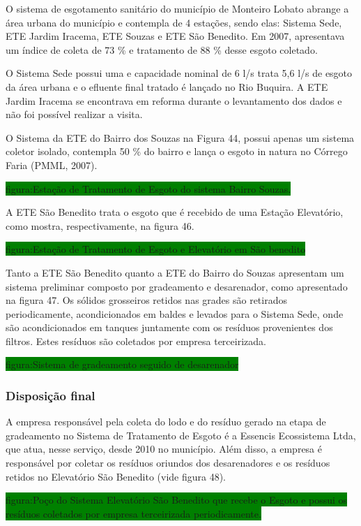 	O sistema de esgotamento sanitário do município de Monteiro Lobato abrange a área urbana do município e contempla de 4 estações, sendo elas: Sistema Sede, ETE Jardim Iracema, ETE Souzas e ETE São Benedito. Em 2007, apresentava um índice de coleta de 73 \% e tratamento de 88 \% desse esgoto coletado. 

	O Sistema Sede possui uma e capacidade nominal de 6 l/s trata 5,6 l/s de esgoto da área urbana e o efluente final tratado é lançado no Rio Buquira. A ETE Jardim Iracema se encontrava em reforma durante o levantamento dos dados e não foi possível realizar a visita. 
	
	O Sistema da ETE do Bairro dos Souzas na Figura 44, possui apenas um sistema coletor isolado, contempla 50 \% do bairro e lança o esgoto in natura no Córrego Faria (PMML, 2007). 
	
	\colorbox{green}{figura:Estação de Tratamento de Esgoto do sistema Bairro Souzas.}
	
	A ETE São Benedito trata o esgoto que é recebido de uma Estação Elevatório, como mostra, respectivamente, na figura 46. 
	
	\colorbox{green}{figura:Estação de Tratamento de Esgoto e Elevatório em São benedito}
	
	Tanto a ETE São Benedito quanto a ETE do Bairro do Souzas apresentam um sistema preliminar composto por gradeamento e desarenador, como apresentado na figura 47. Os sólidos grosseiros retidos nas grades são retirados periodicamente, acondicionados em baldes e levados para o Sistema Sede, onde são acondicionados em tanques juntamente com os resíduos provenientes dos filtros. Estes resíduos são coletados por empresa terceirizada.
	
	\colorbox{green}{figura:Sistema de gradeamento seguido de desarenador}
	
	\subsubsection{Disposição final}
	
	A empresa responsável pela coleta do lodo e do resíduo gerado na etapa de gradeamento no Sistema de Tratamento de Esgoto é a Essencis Ecossistema Ltda, que atua, nesse serviço, desde 2010 no município. Além disso, a empresa é responsável por coletar os resíduos oriundos dos desarenadores e os resíduos retidos no Elevatório São Benedito (vide figura 48). 
	
	\colorbox{green}{figura:Poço do Sistema Elevatório São Benedito que recebe o Esgoto e possui os resíduos coletados por empresa terceirizada periodicamente.}
	
